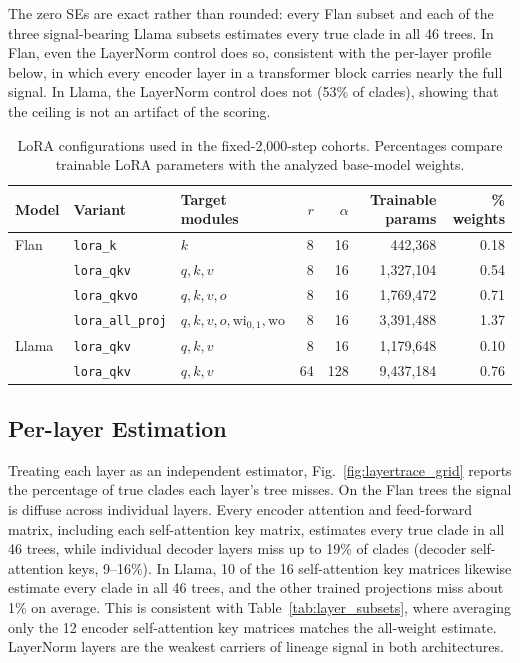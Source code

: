 \documentclass{article}
\theoremstyle{definition}
\theoremstyle{plain}
\begin{document}
The zero SEs are exact rather than rounded: every Flan subset and each of the three signal-bearing
Llama subsets estimates every true clade in all 46 trees. In Flan, even the LayerNorm control does so, consistent with the per-layer profile below, in which every encoder layer in a transformer block carries nearly the full signal. In Llama, the LayerNorm control does not (53\% of clades), showing that the ceiling is not an artifact of the scoring.

\begin{table}[h]
\caption{LoRA configurations used in the fixed-2,000-step cohorts. Percentages compare trainable
LoRA parameters with the analyzed base-model weights.}
\label{tab:lora_variants}
\centering
\scriptsize
\begin{tabular}{lllrrrr}
\toprule
Model & Variant & Target modules & $r$ & $\alpha$ & Trainable params & \% weights \\
\midrule
Flan & \texttt{lora\_k}         & $k$                                      & 8  & 16  & 442,368   & 0.18 \\
     & \texttt{lora\_qkv}       & $q,k,v$                                  & 8  & 16  & 1,327,104 & 0.54 \\
     & \texttt{lora\_qkvo}      & $q,k,v,o$                                & 8  & 16  & 1,769,472 & 0.71 \\
     & \texttt{lora\_all\_proj} & $q,k,v,o,\mathrm{wi}_{0,1},\mathrm{wo}$ & 8  & 16  & 3,391,488 & 1.37 \\
\midrule
Llama & \texttt{lora\_qkv}      & $q,k,v$                                  & 8  & 16  & 1,179,648 & 0.10 \\
      & \texttt{lora\_qkv}      & $q,k,v$                                  & 64 & 128 & 9,437,184 & 0.76 \\
\bottomrule
\end{tabular}
\end{table}

\subsection*{Per-layer Estimation}
\label{app:layertrace}
Treating each layer as an independent estimator, Fig.~\ref{fig:layertrace_grid} reports the percentage
of true clades each layer's tree misses. On the Flan trees the signal is diffuse across individual layers. 
Every encoder attention and feed-forward matrix, including each self-attention key matrix, estimates every true clade in
all 46 trees, while individual decoder layers miss up to 19\% of clades (decoder self-attention keys, 9--16\%). In Llama, 10 of the 16
self-attention key matrices likewise estimate every clade in all 46 trees, and the other trained
projections miss about 1\% on average. This is consistent with Table~\ref{tab:layer_subsets}, where averaging
only the 12 encoder self-attention key matrices matches the all-weight estimate. LayerNorm layers are the weakest carriers of lineage signal in both architectures.
\end{document}
